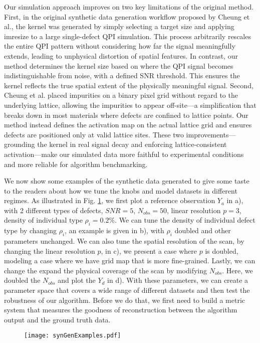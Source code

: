Our simulation approach improves on two key limitations of the original method. First, in the original synthetic data generation workflow proposed by Cheung et al., the kernel was generated by simply selecting a target size and applying imresize to a large single-defect QPI simulation. This process arbitrarily rescales the entire QPI pattern without considering how far the signal meaningfully extends, leading to unphysical distortion of spatial features. In contrast, our method determines the kernel size based on where the QPI signal becomes indistinguishable from noise, with a defined SNR threshold. This ensures the kernel reflects the true spatial extent of the physically meaningful signal. Second, Cheung et al. placed impurities on a binary pixel grid without regard to the underlying lattice, allowing the impurities to appear off-site—a simplification that breaks down in most materials where defects are confined to lattice points. Our method instead defines the activation map on the actual lattice grid and ensures defects are positioned only at valid lattice sites. These two improvements—grounding the kernel in real signal decay and enforcing lattice-consistent activation—make our simulated data more faithful to experimental conditions and more reliable for algorithm benchmarking.

We now show some examples of the synthetic data generated to give some taste to the readers about how we tune the knobs and model datasets in different regimes. As illustrated in Fig. \ref{fig:synexample}, we first plot a reference observation $Y_a$ in a), with 2 different types of defects, $SNR = 5$, $N_{obs}=50$, linear resolution $p = 3$, density of individual type $\rho_i = 0.2 \%$. We can tune the density of individual defect type by changing $\rho_i$, an example is given in b), with $\rho_i$ doubled and other parameters unchanged. We can also tune the spatial resolution of the scan, by changing the linear resolution $p$, in c), we present a case where $p$ is doubled, modeling a case where we have grid map that is more fine-grained. Lastly, we can change the expand the physical coverage of the scan by modifying $N_{obs}$. Here, we doubled the $N_{obs}$ and plot the $Y_d$ in d). With these parameters, we can create a parameter space that covers a wide range of different datasets and then test the robustness of our algorithm. Before we do that, we first need to build a metric system that measures the goodness of reconstruction between the algorithm output and the ground truth data. 

\begin{figure}
	\texttt{[image: synGenExamples.pdf]} 
	\centering
	\caption{}
	\label{fig:synexample}
\end{figure}

